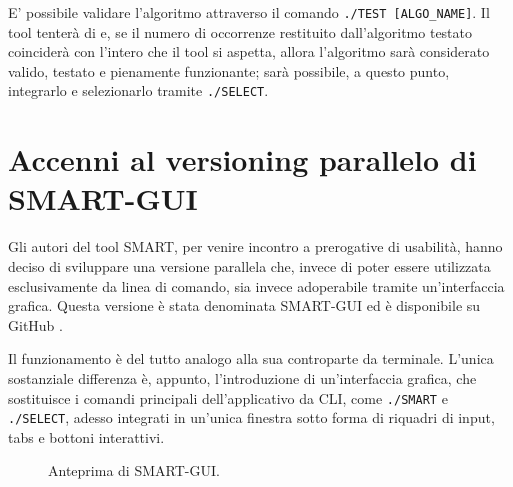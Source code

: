 E' possibile validare l'algoritmo attraverso il comando \verb|./TEST [ALGO_NAME]|. Il tool tenterà di e, se il numero di occorrenze restituito dall'algoritmo testato coinciderà con l'intero che il tool si aspetta, allora l'algoritmo sarà considerato valido, testato e pienamente funzionante; sarà possibile, a questo punto, integrarlo e selezionarlo tramite \verb|./SELECT|.


\section{Accenni al versioning parallelo di SMART-GUI}

Gli autori del tool SMART, per venire incontro a prerogative di usabilità, hanno deciso di sviluppare una versione parallela che, invece di poter essere utilizzata esclusivamente da linea di comando, sia invece adoperabile tramite un'interfaccia grafica. Questa versione è stata denominata SMART-GUI ed è disponibile su GitHub \cite{smartGUI}. 

\vspace{3mm}

Il funzionamento è del tutto analogo alla sua controparte da terminale. L'unica sostanziale differenza è, appunto, l'introduzione di un'interfaccia grafica, che sostituisce i comandi principali dell'applicativo da CLI, come \verb|./SMART| e \verb|./SELECT|, adesso integrati in un'unica finestra sotto forma di riquadri di input, tabs e bottoni interattivi.

\vspace{3mm}

\begin{figure}[ht!]
    \centering
    \caption{Anteprima di SMART-GUI.}
    \label{fig:esempio}
\end{figure}

